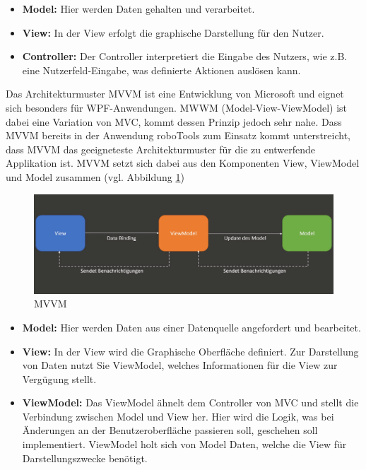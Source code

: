 \documentclass[ a4paper,
                oneside,
                toc=bibliography,
                toc=listof
                ]{scrbook}
\begin{document}
	\begin{itemize}
		\item \textbf{Model: }Hier werden Daten gehalten und verarbeitet.
		\item \textbf{View: } In der View erfolgt die graphische Darstellung für den Nutzer.
		\item \textbf{Controller: } Der Controller interpretiert die Eingabe des Nutzers, wie z.B. eine Nutzerfeld-Eingabe, was definierte Aktionen auslösen kann.
	\end{itemize}
	Das Architekturmuster MVVM ist eine Entwicklung von Microsoft und eignet sich besonders für WPF-Anwendungen. MWWM (Model-View-ViewModel) ist dabei eine Variation von MVC, kommt dessen Prinzip jedoch sehr nahe. \cite{MVVMKraus} \cite{kotz2022c} \cite{troelsen2022pro}
	Dass MVVM bereits in der Anwendung roboTools zum Einsatz kommt unterstreicht, dass MVVM das geeigneteste Architekturmuster für die zu entwerfende Applikation ist. MVVM setzt sich dabei aus den Komponenten View, ViewModel und Model zusammen (vgl. Abbildung \ref{fig:MVVM})
	\begin{figure}[!ht]
		\centering
		\includegraphics[width=1.0\linewidth]{./images/MVVM.png}
		\caption{MVVM \cite{MVVMKraus}}
		\label{fig:MVVM}
	\end{figure}
	\begin{itemize}
		\item \textbf{Model: } Hier werden Daten aus einer Datenquelle angefordert und bearbeitet.
		\item \textbf{View: } In der View wird die Graphische Oberfläche definiert. Zur Darstellung von Daten nutzt Sie ViewModel, welches Informationen für die View zur Vergügung stellt.
		\item \textbf{ViewModel: } Das ViewModel ähnelt dem Controller von MVC und stellt die Verbindung zwischen Model und View her. Hier wird die Logik, was bei Änderungen an der Benutzeroberfläche passieren soll, geschehen soll implementiert. ViewModel holt sich von Model Daten, welche die View für Darstellungszwecke benötigt. \cite{MVVMKraus} \cite{troelsen2022pro}
	\end{itemize}
\end{document}
